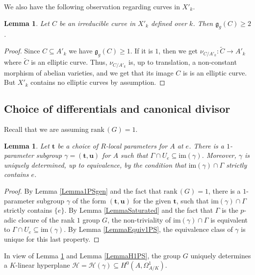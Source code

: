 \documentclass[11pt]{amsart}
\newtheorem{lemma}[theorem]{Lemma}
\theoremstyle{remark}
\numberwithin{equation}{section}
\newcommand{\gfrak}{\mathfrak{g}}
\newcommand{\Hcal}{\mathscr{H}}
\newcommand{\ttt}{\mathbf{t}}
\newcommand{\uu}{\mathbf{u}}
\newcommand{\rk}{\mathrm{rank}\,}
\newcommand{\im}{\mathrm{im}}
\begin{document}
We also have the following observation regarding curves in $X'_k$.

\begin{lemma}\label{LemmaGenus2} Let $C$ be an irreducible curve in $X'_k$ defined over $k$. Then $\gfrak_g(C)\ge 2$.
\end{lemma}
\begin{proof} Since $C\subseteq A'_k$ we have $\gfrak_g(C)\ge 1$. If it is $1$, then we get $\nu_{C/A'_k}:\widetilde{C}\to A'_k$ where $\widetilde{C}$ is an elliptic curve. Thus, $\nu_{C/A'_k}$ is, up to translation, a non-constant morphism of abelian varieties, and we get that its image $C$ is is an elliptic curve. But $X'_k$ contains no elliptic curves by assumption. 
\end{proof}



\subsection{Choice of differentials and canonical divisor} \label{SecChoiceDiff} Recall that  we are assuming $\rk(G)=1$.

\begin{lemma}\label{LemmaChoice1PS} Let $\ttt$ be a choice of $R$-local parameters for $A$ at $e$. There is a $1$-parameter subgroup $\gamma=(\ttt,\uu)$ for $A$ such that $\Gamma\cap U_e\subseteq \im(\gamma)$. Moreover, $\gamma$ is uniquely determined, up to equivalence, by the condition that $\im(\gamma)\cap \Gamma$ strictly contains $e$.
\end{lemma}
\begin{proof} By Lemma \ref{Lemma1PSgen} and the fact that $\rk(G)=1$,  there is a $1$-parameter subgroup $\gamma$ of the form $(\ttt,\uu)$ for the given $\ttt$, such that $\im(\gamma)\cap \Gamma$ strictly contains $\{e\}$. By Lemma \ref{LemmaSaturated} and the fact that $\Gamma$ is the $p$-adic closure of the rank $1$ group $G$, the non-triviality of $\im(\gamma)\cap \Gamma$ is equivalent to $\Gamma\cap U_e\subseteq \im(\gamma)$. By Lemma \ref{LemmaEquiv1PS}, the equivalence class of $\gamma$ is unique for this last property.
\end{proof}


In view of Lemma \ref{LemmaChoice1PS} and Lemma \ref{LemmaH1PS}, the group $G$ uniquely determines a $K$-linear hyperplane $\Hcal=\Hcal(\gamma)\subseteq H^0(A, \Omega^1_{A/K})$. 
\end{document}
